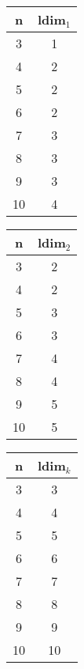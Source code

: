 \documentclass[12pt,a4paper]{amsart}
\theoremstyle{plain} %
\begin{document}
\begin{enumerate}
\begin{table}[h]
    \begin{minipage}{.33\linewidth}
        \centering
        \begin{tabular}{cc}
            \textbf{n} & \textbf{ldim$_1$} \\
            \hline
            3 & 1 \\
            4 & 2 \\
            5 & 2 \\
            6 & 2 \\
            7 & 3 \\
            8 & 3 \\
            9 & 3 \\
            10 & 4 \\
        \end{tabular}
        \label{tab:tabela1}
    \end{minipage}%
    \begin{minipage}{.33\linewidth}
        \centering
        \begin{tabular}{cc}
            \textbf{n} & \textbf{ldim$_2$} \\
            \hline
            3 & 2 \\
            4 & 2 \\
            5 & 3 \\
            6 & 3 \\
            7 & 4 \\
            8 & 4 \\
            9 & 5 \\
            10 & 5 \\
        \end{tabular}
        \label{tab:tabela2}
    \end{minipage}%
    \begin{minipage}{.33\linewidth}
        \centering
        \begin{tabular}{cc}
            \textbf{n} & \textbf{ldim$_k$} \\
            \hline
            3 & 3 \\
            4 & 4 \\
            5 & 5 \\
            6 & 6 \\
            7 & 7 \\
            8 & 8 \\
            9 & 9 \\
            10 & 10 \\
        \end{tabular}
        \label{tab:tabela3}
    \end{minipage}
\end{table}


\end{enumerate}
\end{document}
